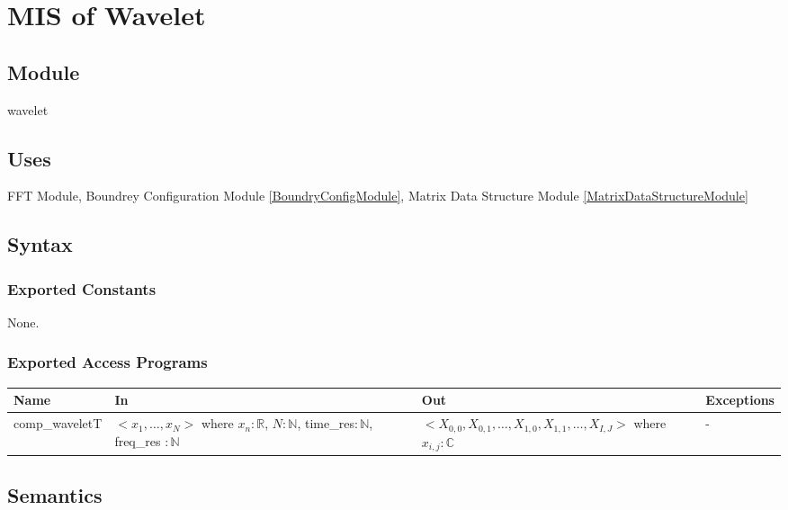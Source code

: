 \documentclass[12pt, titlepage]{article}
\begin{document}
\newpage
\section{MIS of Wavelet} \label{WaveletModule} 



\subsection{Module}
wavelet

\subsection{Uses}
FFT Module, Boundrey Configuration Module \ref{BoundryConfigModule}, Matrix Data Structure Module \ref{MatrixDataStructureModule}
\subsection{Syntax}

\subsubsection{Exported Constants}
None.
\subsubsection{Exported Access Programs}

\begin{center}
\begin{tabular}{p{2.5cm} p{4cm} p{4cm} p{2cm}}
\hline
\textbf{Name} & \textbf{In} & \textbf{Out} & \textbf{Exceptions} \\
\hline
comp\_waveletT & $<x_1,\dots,x_N>$ where $ x_n:\mathbb{R}$, $N:\mathbb{N}$, time\_res$:\mathbb{N}$, freq\_res $:\mathbb{N}$ & $<X_{0,0},X_{0,1},\dots, X_{1,0},X_{1,1},\dots, X_{I,J}>$ where $ x_{i,j}:\mathbb{C}$ & - \\
\hline
\end{tabular}
\end{center}

\subsection{Semantics}
\end{document}
